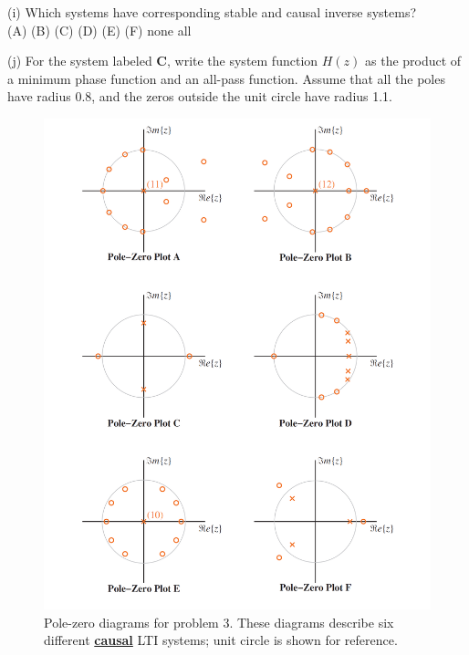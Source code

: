 \documentclass[12pt]{report}
\begin{document}
\begin{description}
	\item{(i) } Which systems have corresponding stable and causal inverse systems? \\
	\hspace{10cm} (A)  \hspace{1cm}  (B)  \hspace{1cm}  (C) \hspace{1cm} (D) \hspace{1cm}  (E) \hspace{1cm} (F) \hspace{1cm} none \hspace{1cm}  all
	
	\item{(j) } For the system labeled \textbf{C}, write the system function $H(z)$ as the product of a minimum phase function and an all-pass function. Assume that all the poles have radius 0.8, and the zeros outside the unit circle have radius 1.1.
\end{description}

\begin{figure}[h!]
	\centering
	\includegraphics[scale=0.4]{figs/several_pole_zero_diagram.png}
	\caption{Pole-zero diagrams for problem 3. These diagrams describe six different \textbf{\underline{causal}} LTI systems; unit circle is shown for reference.}
	\label{fig:pole-zero-diagram}
\end{figure}
\end{document}
